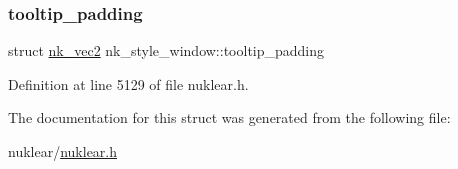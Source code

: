 \subsubsection{\texorpdfstring{tooltip\+\_\+padding}{tooltip\_padding}}
{\footnotesize\ttfamily struct \mbox{\hyperlink{structnk__vec2}{nk\+\_\+vec2}} nk\+\_\+style\+\_\+window\+::tooltip\+\_\+padding}



Definition at line 5129 of file nuklear.\+h.



The documentation for this struct was generated from the following file\+:\begin{DoxyCompactItemize}
\item 
nuklear/\mbox{\hyperlink{nuklear_8h}{nuklear.\+h}}\end{DoxyCompactItemize}

